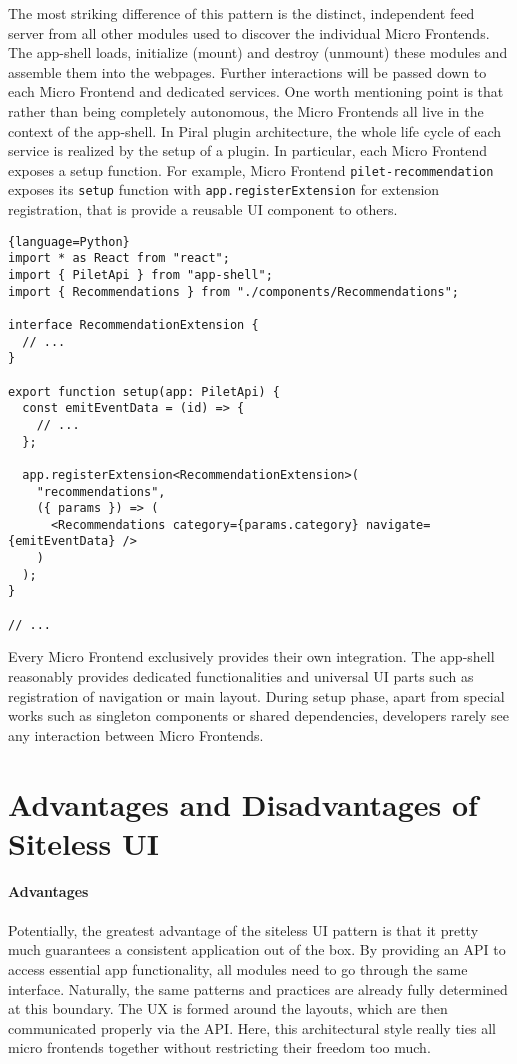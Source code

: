 \documentclass[a4paper]{book}
\begin{document}
The most striking difference of this pattern is the distinct, independent feed server from all other modules used to discover the individual Micro Frontends. The app-shell loads, initialize (mount) and destroy (unmount) these modules and assemble them into the webpages. Further interactions will be passed down to each Micro Frontend and dedicated services. One worth mentioning point is that rather than being completely autonomous, the Micro Frontends all live in the context of the app-shell. In Piral plugin architecture, the whole life cycle of each service is realized by the setup of a plugin. In particular, each Micro Frontend exposes a setup function. For example, Micro Frontend \verb|pilet-recommendation| exposes its \verb|setup| function with \verb|app.registerExtension| for extension registration, that is provide a reusable UI component to others.
\begin{lstlisting}{language=Python}
import * as React from "react";
import { PiletApi } from "app-shell";
import { Recommendations } from "./components/Recommendations";

interface RecommendationExtension {
  // ...
}

export function setup(app: PiletApi) {
  const emitEventData = (id) => {
    // ...
  };

  app.registerExtension<RecommendationExtension>(
    "recommendations",
    ({ params }) => (
      <Recommendations category={params.category} navigate={emitEventData} />
    )
  );
}

// ...
\end{lstlisting}
Every Micro Frontend exclusively provides their own integration. The app-shell reasonably provides dedicated functionalities and universal UI parts such as registration of navigation or main layout. During setup phase, apart from special works such as singleton components or shared dependencies, developers rarely see any interaction between Micro Frontends.
\section{Advantages and Disadvantages of Siteless UI}
\textbf{Advantages}
\\ \\
Potentially, the greatest advantage of the siteless UI pattern is that it pretty much guarantees a consistent application out of the box. By providing an API to access essential app functionality, all modules need to go through the same interface. Naturally, the same patterns and practices are already fully determined at this boundary. The UX is formed around the layouts, which are then communicated properly via the API. Here, this architectural style really ties all micro frontends together without restricting their freedom too much.
\end{document}
